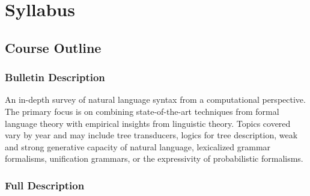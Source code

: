 \setcounter{chapter}{-1}
\chapter{Syllabus}
\label{cha:syllabus}
\setcounter{page}{1}


\section{Course Outline}

\subsection{Bulletin Description}

An in-depth survey of natural language syntax from a computational perspective.
The primary focus is on combining state-of-the-art techniques from formal language theory with empirical insights from linguistic theory.
Topics covered vary by year and may include tree transducers, logics for tree description, weak and strong generative capacity of natural language, lexicalized grammar formalisms, unification grammars, or the expressivity of probabilistic formalisms.


\subsection{Full Description}

